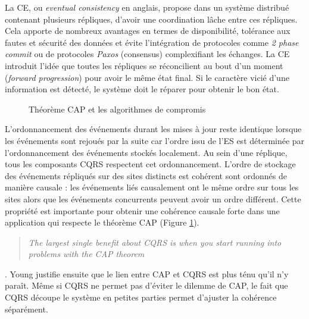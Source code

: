 La \gls{CE}, ou \textit{eventual consistency} en anglais, propose dans un système 
distribué contenant plusieurs répliques, d'avoir une coordination lâche entre ces 
répliques. Cela apporte de nombreux avantages en termes de disponibilité, 
tolérance aux fautes et sécurité des données et évite l'intégration de protocoles comme \textit{2 
phase commit} ou de protocoles \textit{Paxos} (consensus) complexifiant les échanges. 
La \gls{CE} introduit l'idée que toutes les répliques se réconcilient au bout d'un 
moment (\textit{forward progression}) pour avoir le même état final. Si le caractère 
vicié d'une information est détecté, le système doit le \og réparer\fg{} pour obtenir 
le bon état. 
\begin{figure} [ht]
	\centering
	\caption{Théorème CAP et les algorithmes de compromis}
	\label{fig:cap}
\end{figure}
L'ordonnancement des événements durant les mises à jour reste identique lorsque
les événements sont rejoués par la suite car l'ordre issu de l'\gls{ES} est 
déterminée par l'ordonnancement des événements stockés 
localement. Au sein d'une réplique, tous les composants \gls{CQRS} respectent 
cet ordonnancement. L’ordre de stockage des événements répliqués sur des sites 
distincts est cohérent sont ordonnés de manière causale \cite{Lamport1978} : les 
événements liés causalement ont le même ordre sur tous les sites alors que les 
événements concurrents peuvent avoir un ordre différent. Cette propriété est 
importante pour obtenir une cohérence causale forte dans une application qui 
respecte le théorème \gls{CAP} (Figure \ref{fig:cap}).  \blockquote[]{	\textit{The 
largest single 
benefit about 
CQRS is when 
		you start running into 
		problems 
		with the CAP theorem}}{
	\cite{Young2010}
}.
Young justifie ensuite que le lien entre \gls{CAP} et \gls{CQRS} est plus ténu qu'il 
n'y paraît. Même si \gls{CQRS} ne permet pas d'éviter le dilemme de \gls{CAP}, le 
fait que \gls{CQRS} découpe le système en petites parties permet d'ajuster la 
cohérence séparément.


